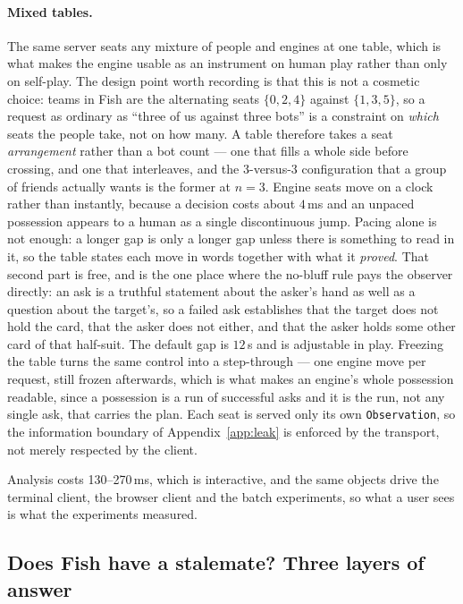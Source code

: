 \documentclass[11pt,letterpaper]{article}
\begin{document}
\paragraph{Mixed tables.} The same server seats any mixture of people and
engines at one table, which is what makes the engine usable as an instrument on
human play rather than only on self-play. The design point worth recording is
that this is not a cosmetic choice: teams in Fish are the alternating seats
$\{0,2,4\}$ against $\{1,3,5\}$, so a request as ordinary as ``three of us
against three bots'' is a constraint on \emph{which} seats the people take, not
on how many. A table therefore takes a seat \emph{arrangement} rather than a bot
count --- one that fills a whole side before crossing, and one that interleaves,
and the 3-versus-3 configuration that a group of friends actually wants is
the former at $n=3$. Engine seats move on a clock rather than instantly, because
a decision costs about $4$\,ms and an unpaced possession appears to a human as a
single discontinuous jump. Pacing alone is not enough: a longer gap is
only a longer gap unless there is something to read in it, so the table
states each move in words together with what it \emph{proved}. That
second part is free, and is the one place where the no-bluff rule pays
the observer directly: an ask is a truthful statement about the asker's
hand as well as a question about the target's, so a failed ask
establishes that the target does not hold the card, that the asker does
not either, and that the asker holds some other card of that half-suit.
The default gap is $12$\,s and is adjustable in play. Freezing the table
turns the same control into a step-through --- one engine move per
request, still frozen afterwards, which is what makes an engine's
whole possession readable, since a possession is a run of successful
asks and it is the run, not any single ask, that carries the plan. Each seat is served only its own
\texttt{Observation}, so the information boundary of
Appendix~\ref{app:leak} is enforced by the transport, not merely respected by
the client.

Analysis costs 130--270\,ms, which is interactive, and the same objects drive
the terminal client, the browser client and the batch experiments, so what a
user sees is what the experiments measured.

\subsection{Does Fish have a stalemate? Three layers of answer}
\label{sec:perpetual}
\end{document}
